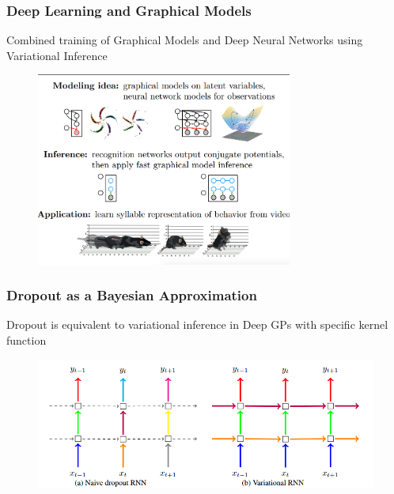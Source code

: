 \documentclass[11pt,
               hyperref={colorlinks,citecolor=pink,linkcolor=red,urlcolor=blue}
               ]{beamer}
\begin{document}
  \begin{frame}
    \frametitle{Deep Learning and Graphical Models}

    \centering Combined training of Graphical Models and Deep Neural Networks using Variational Inference\footnotemark[1]

    \begin{figure}
      \centering
      \includegraphics[width=0.75\textwidth]{bnn2.png}
    \end{figure}

  \end{frame}

  \begin{frame}
    \frametitle{Dropout as a Bayesian Approximation}

    \centering Dropout is equivalent to variational inference in Deep GPs with specific kernel function

    \begin{figure}
      \centering
      \includegraphics[width=\textwidth]{bnn4.png}
    \end{figure}

  \end{frame}
\end{document}
